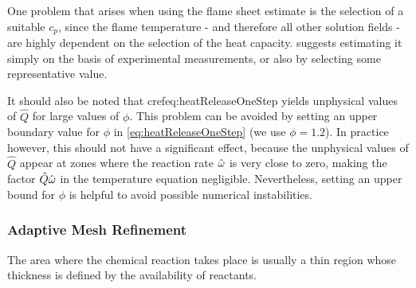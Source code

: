 One problem that arises when using the flame sheet estimate is the selection of a suitable $c_p$, since the flame temperature - and therefore all other solution fields - are highly dependent on the selection of the heat capacity. \cite{xuApplicationPrimitiveVariable1993} suggests estimating it simply on the basis of experimental measurements, or also by selecting some representative value.

It should also be noted that cref{eq:heatReleaseOneStep} yields unphysical values of $\hat Q$ for large values of $\phi$. This problem can be avoided by setting an upper boundary value for $\phi$ in \cref{eq:heatReleaseOneStep} (we use $\phi = 1.2$). In practice however, this should not have a significant effect, because the unphysical values of $\hat Q$ appear at zones where the reaction rate $\hat{\omega}$ is very close to zero, making the factor $\hat Q \hat{\omega}$ in the temperature equation negligible. Nevertheless, setting an upper bound for $\phi$ is helpful to avoid possible numerical instabilities.


\subsubsection{Adaptive Mesh Refinement}\label{ssec:MeshRefinement}
The area where the chemical reaction takes place is usually a thin region whose thickness is defined by the availability of reactants.
